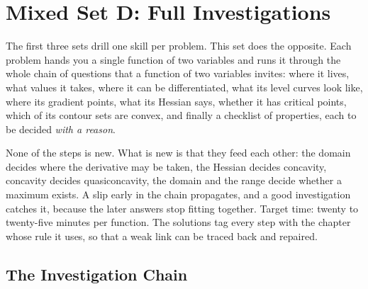 \chapter{Mixed Set D: Full Investigations}

The first three sets drill one skill per problem. This set does the
opposite. Each problem hands you a single function of two variables and
runs it through the whole chain of questions that a function of two
variables invites: where it lives, what values it takes, where it can be
differentiated, what its level curves look like, where its gradient
points, what its Hessian says, whether it has critical points, which of
its contour sets are convex, and finally a checklist of properties, each
to be decided \emph{with a reason}.

None of the steps is new. What is new is that they feed each other: the
domain decides where the derivative may be taken, the Hessian decides
concavity, concavity decides quasiconcavity, the domain and the range
decide whether a maximum exists. A slip early in the chain propagates,
and a good investigation catches it, because the later answers stop
fitting together. Target time: twenty to twenty-five minutes per
function. The solutions tag every step with the chapter whose
rule it uses, so that a weak link can be traced back and repaired.

\section{The Investigation Chain}

